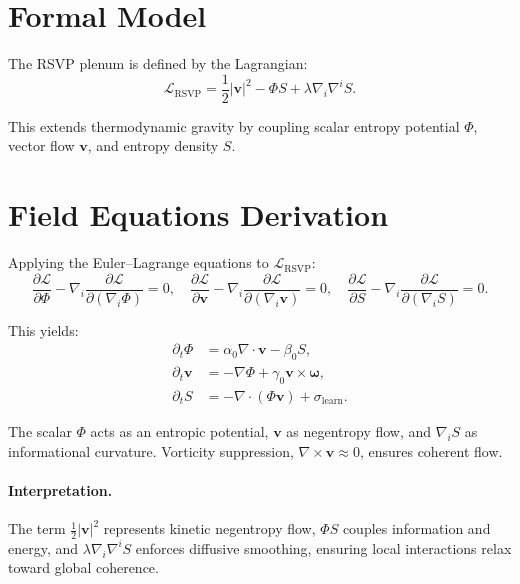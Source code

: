 \documentclass[12pt]{book}
\theoremstyle{definition}
\begin{document}
\section{Formal Model}
The RSVP plenum is defined by the Lagrangian:
\begin{equation}
\label{eq:rsvp_lagrangian}
\mathcal{L}_{\text{RSVP}} = \frac{1}{2}|\mathbf{v}|^2 - \Phi S + \lambda \nabla_i \nabla^i S.
\end{equation}

This extends thermodynamic gravity \cite{jacobson1995thermodynamics, gibbs2025entropic} by coupling scalar entropy potential $\Phi$, vector flow $\mathbf{v}$, and entropy density $S$.

\section{Field Equations Derivation}
Applying the Euler–Lagrange equations to $\mathcal{L}_{\text{RSVP}}$:
\begin{equation}
\frac{\partial \mathcal{L}}{\partial \Phi} - \nabla_i \frac{\partial \mathcal{L}}{\partial (\nabla_i \Phi)} = 0, \quad
\frac{\partial \mathcal{L}}{\partial \mathbf{v}} - \nabla_i \frac{\partial \mathcal{L}}{\partial (\nabla_i \mathbf{v})} = 0, \quad
\frac{\partial \mathcal{L}}{\partial S} - \nabla_i \frac{\partial \mathcal{L}}{\partial (\nabla_i S)} = 0.
\end{equation}

This yields:
\begin{align}
\partial_t \Phi &= \alpha_0 \nabla \cdot \mathbf{v} - \beta_0 S, \label{eq:phi_eq} \\
\partial_t \mathbf{v} &= -\nabla \Phi + \gamma_0 \mathbf{v} \times \boldsymbol{\omega}, \label{eq:v_eq} \\
\partial_t S &= -\nabla \cdot (\Phi \mathbf{v}) + \sigma_{\text{learn}}. \label{eq:s_eq}
\end{align}

The scalar $\Phi$ acts as an entropic potential, $\mathbf{v}$ as negentropy flow, and $\nabla_i S$ as informational curvature. Vorticity suppression, $\nabla \times \mathbf{v} \approx 0$, ensures coherent flow.

\paragraph{Interpretation.} The term $\frac{1}{2}|\mathbf{v}|^2$ represents kinetic negentropy flow, $\Phi S$ couples information and energy, and $\lambda \nabla_i \nabla^i S$ enforces diffusive smoothing, ensuring local interactions relax toward global coherence.
\end{document}
